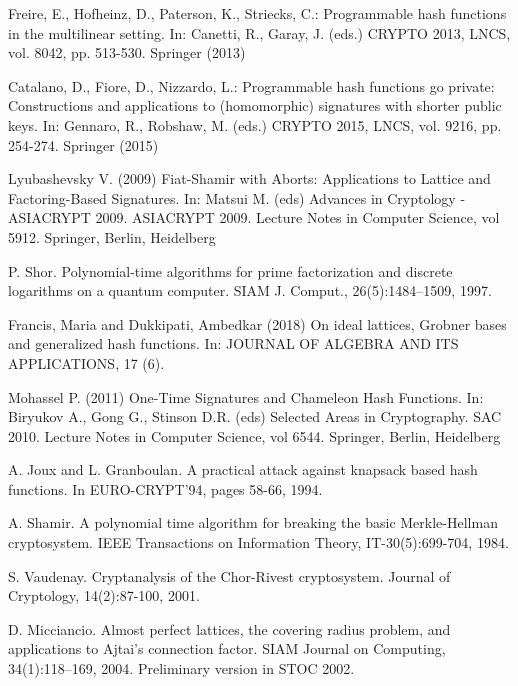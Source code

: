 \documentclass[10pt]{elsarticle}
\begin{document}
\begin{thebibliography}{9}
 Freire, E., Hofheinz, D., Paterson, K., Striecks, C.: Programmable hash functions in the multilinear setting. In: Canetti, R., Garay, J. (eds.) CRYPTO 2013, LNCS, vol. 8042, pp. 513-530. Springer (2013)

 Catalano, D., Fiore, D., Nizzardo, L.: Programmable hash functions go private: Constructions and applications to (homomorphic) signatures with shorter public keys. In: Gennaro, R., Robshaw, M. (eds.) CRYPTO 2015, LNCS, vol. 9216, pp. 254-274. Springer (2015)

 Lyubashevsky V. (2009) Fiat-Shamir with Aborts: Applications to Lattice and Factoring-Based Signatures. In: Matsui M. (eds) Advances in Cryptology - ASIACRYPT 2009. ASIACRYPT 2009. Lecture Notes in Computer Science, vol 5912. Springer, Berlin, Heidelberg

 P. Shor. Polynomial-time algorithms for prime factorization and discrete logarithms on a quantum computer. SIAM J. Comput., 26(5):1484–1509, 1997.


 Francis, Maria and Dukkipati, Ambedkar (2018) On ideal lattices, Grobner bases and generalized hash functions. In: JOURNAL OF ALGEBRA AND ITS APPLICATIONS, 17 (6).

 Mohassel P. (2011) One-Time Signatures and Chameleon Hash Functions. In: Biryukov A., Gong G., Stinson D.R. (eds) Selected Areas in Cryptography. SAC 2010. Lecture Notes in Computer Science, vol 6544. Springer, Berlin, Heidelberg


A. Joux and L. Granboulan. A practical attack against knapsack based hash functions. In EURO-CRYPT'94, pages 58-66, 1994.

 A. Shamir. A polynomial time algorithm for breaking the basic Merkle-Hellman cryptosystem. IEEE Transactions on Information Theory, IT-30(5):699-704, 1984.

S. Vaudenay. Cryptanalysis of the Chor-Rivest cryptosystem. Journal of Cryptology, 14(2):87-100, 2001.

 D. Micciancio. Almost perfect lattices, the covering radius problem, and applications to Ajtai's connection factor. SIAM Journal on Computing, 34(1):118–169, 2004. Preliminary version in STOC 2002.
\end{thebibliography}
\end{document}
